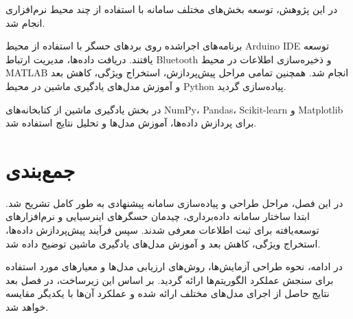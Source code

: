 در این پژوهش، توسعه بخش‌های مختلف سامانه با استفاده از چند محیط نرم‌افزاری انجام شد.

برنامه‌های اجراشده روی بردهای حسگر با استفاده از محیط Arduino IDE توسعه یافتند. دریافت داده‌ها، مدیریت ارتباط Bluetooth و ذخیره‌سازی اطلاعات در محیط MATLAB انجام شد. همچنین تمامی مراحل پیش‌پردازش، استخراج ویژگی، کاهش بعد و آموزش مدل‌های یادگیری ماشین در محیط Python پیاده‌سازی گردید.

در بخش یادگیری ماشین از کتابخانه‌های NumPy، Pandas، Scikit-learn و Matplotlib برای پردازش داده‌ها، آموزش مدل‌ها و تحلیل نتایج استفاده شد.


\section*{جمع‌بندی}

در این فصل، مراحل طراحی و پیاده‌سازی سامانه پیشنهادی به طور کامل تشریح شد. ابتدا ساختار سامانه داده‌برداری، چیدمان حسگرهای اینرسیایی و نرم‌افزارهای توسعه‌یافته برای ثبت اطلاعات معرفی شدند. سپس فرآیند پیش‌پردازش داده‌ها، استخراج ویژگی، کاهش بعد و آموزش مدل‌های یادگیری ماشین توضیح داده شد.

در ادامه، نحوه طراحی آزمایش‌ها، روش‌های ارزیابی مدل‌ها و معیارهای مورد استفاده برای سنجش عملکرد الگوریتم‌ها ارائه گردید. بر اساس این زیرساخت، در فصل بعد نتایج حاصل از اجرای مدل‌های مختلف ارائه شده و عملکرد آن‌ها با یکدیگر مقایسه خواهد شد.
